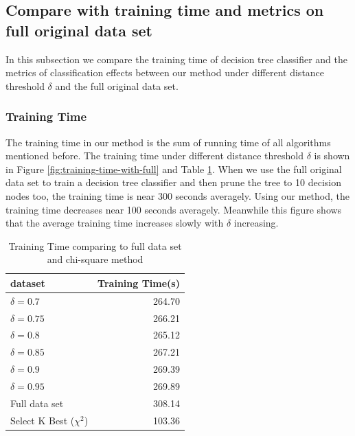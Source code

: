 \documentclass{ieeeaccess}
\theoremstyle{definition}
\begin{document}
\subsection{Compare with training time and metrics on full original data set}

In this subsection we compare the training time of decision tree classifier and the metrics of classification effects between our method under different distance threshold $\delta$ and the full original data set.

\subsubsection{Training Time}

The training time in our method is the sum of running time of all algorithms mentioned before. The training time under different distance threshold $\delta$ is shown in Figure \ref{fig:training-time-with-full} and Table \ref{tab:training-time-all}.
When we use the full original data set to train a decision tree classifier and then prune the tree to 10 decision nodes too, the training time is near 300 seconds averagely. Using our method, the training time decreases near 100 seconds averagely.
Meanwhile this figure shows that the average training time increases slowly with $\delta$ increasing.

\begin{table}[!htbp]
    \centering
    \caption{Training Time comparing to full data set and chi-square method}
    \label{tab:training-time-all}
    \begin{tabular}{lr}
        \toprule
        dataset & Training Time(s) \\
        \midrule
        $\delta=0.7$ & 264.70 \\
        $\delta=0.75$ & 266.21 \\
        $\delta=0.8$ & 265.12 \\
        $\delta=0.85$ &  267.21 \\
        $\delta=0.9$ &   269.39 \\
        $\delta=0.95$ & 269.89 \\
        Full data set & 308.14 \\
        Select K Best ($\chi^2$) & 103.36 \\
        \bottomrule
    \end{tabular}
\end{table}
\end{document}
